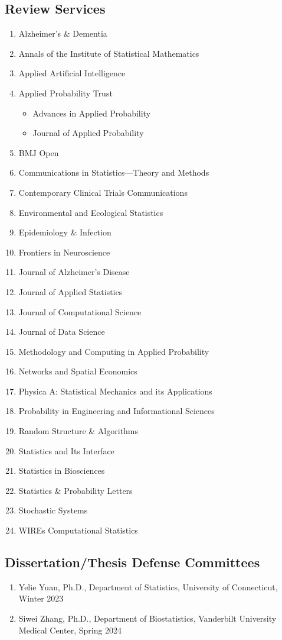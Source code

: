 \documentclass[12pt]{article}
\begin{document}
	\subsection*{Review Services}
	\begin{enumerate}
		\item Alzheimer's \& Dementia
		\item Annals of the Institute of Statistical Mathematics
		\item Applied Artificial Intelligence
		\item Applied Probability Trust
		\begin{itemize}
			\item Advances in Applied Probability 
			\item Journal of Applied Probability
		\end{itemize}
		\item BMJ Open
		\item Communications in Statistics---Theory and Methods
		\item Contemporary Clinical Trials Communications
		\item Environmental and Ecological Statistics
		\item Epidemiology \& Infection
		\item Frontiers in Neuroscience
		\item Journal of Alzheimer's Disease
		\item Journal of Applied Statistics
		\item Journal of Computational Science 
		\item Journal of Data Science
		\item Methodology and Computing in Applied Probability
		\item Networks and Spatial Economics
		\item Physica A: Statistical Mechanics and its Applications
		\item Probability in Engineering and Informational Sciences
		\item Random Structure \& Algorithms
		\item Statistics and Its Interface
		\item Statistics in Biosciences
		\item Statistics \& Probability Letters
		\item Stochastic Systems
		\item WIREs Computational Statistics
	\end{enumerate}
	
	\subsection*{Dissertation/Thesis Defense Committees}
	\begin{enumerate}
		\item Yelie Yuan, Ph.D., Department of Statistics, 
		University of Connecticut, Winter 2023
		\item Siwei Zhang, Ph.D., Department of Biostatistics, 
		Vanderbilt University Medical Center, Spring 2024
	\end{enumerate}
	
\end{document}
